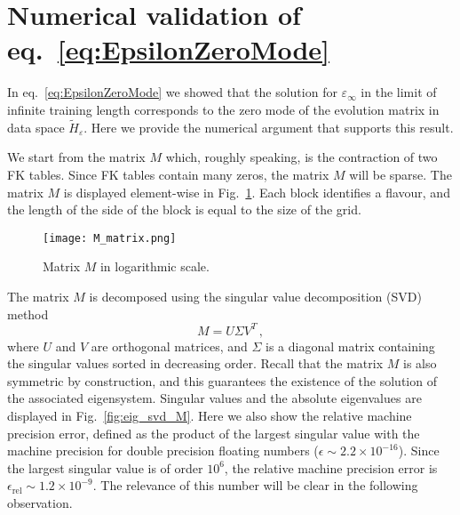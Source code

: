 \section{Numerical validation of eq.~\eqref{eq:EpsilonZeroMode}} In
eq.~\eqref{eq:EpsilonZeroMode} we showed that the solution for
$\varepsilon_{\infty}$ in the limit of infinite training length corresponds to
the zero mode of the evolution matrix in data space $\tilde{H}_{\varepsilon}$.
Here we provide the numerical argument that supports this result.

We start from the matrix $M$ which, roughly speaking, is the contraction of two
FK tables. Since FK tables contain many zeros, the matrix $M$ will be sparse.
The matrix $M$ is displayed element-wise in Fig.~\ref{fig:MatrixM}. Each block
identifies a flavour, and the length of the side of the block is equal to the
size of the grid. 
\begin{figure}[h]
  \centering
  \texttt{[image: M\_matrix.png]}
  \caption{\small Matrix $M$ in logarithmic scale.}
  \label{fig:MatrixM}
\end{figure}
The matrix $M$ is decomposed using the singular value decomposition (SVD) method
\begin{equation}
M = U \Sigma V^T \,,
\end{equation}
where $U$ and $V$ are orthogonal matrices, and $\Sigma$ is a diagonal matrix
containing the singular values sorted in decreasing order. Recall that the
matrix $M$ is also symmetric by construction, and this guarantees the existence
of the solution of the associated eigensystem. Singular values and the absolute
eigenvalues are displayed in Fig.~\ref{fig:eig_svd_M}. Here we also show the
relative machine precision error, defined as the product of the largest singular
value with the machine precision for double precision floating numbers
($\epsilon \sim 2.2 \times 10^{-16}$). Since the largest singular value is of
order $10^6$, the relative machine precision error is
$\epsilon_{\textrm{rel}}\sim1.2\times 10^{-9}$. The relevance of this number
will be clear in the following observation.

